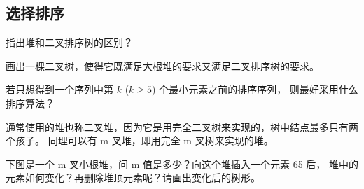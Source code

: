 \subsection{选择排序}

\begin{qitems}
    \begin{bbox}
        \qitem 指出堆和二叉排序树的区别？
    \end{bbox}
    \begin{bbox}
        \qitem 画出一棵二叉树，使得它既满足大根堆的要求又满足二叉排序树的要求。
    \end{bbox}
    \begin{bbox}
        \qitem 若只想得到一个序列中第 $k$ ($k \ge 5$) 个最小元素之前的排序序列，
        则最好采用什么排序算法？
    \end{bbox}
    \begin{bbox}
        \qitem 通常使用的堆也称二叉堆，因为它是用完全二叉树来实现的，树中结点最多只有两个孩子。
        同理可以有 m 叉堆，即用完全 m 叉树来实现的堆。
        \begin{subqitems}
            \subqitem 下图是一个 m 叉小根堆，问 m 值是多少？向这个堆插入一个元素 65 后，
            堆中的元素如何变化？再删除堆顶元素呢？请画出变化后的树形。
            
            \begin{center}
            \end{center}
            

\end{subqitems}
\end{bbox}
\end{qitems}

